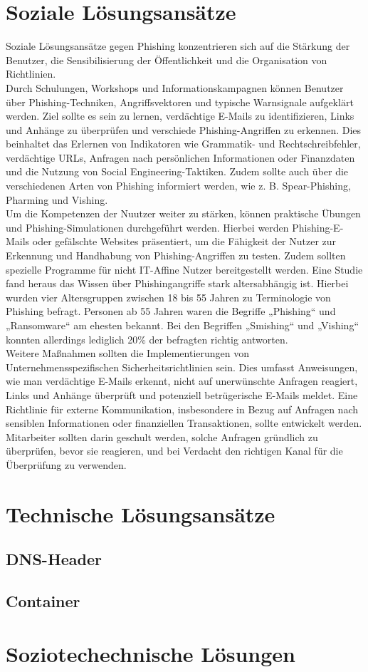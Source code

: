 \documentclass[journal=tosc,final]{iacrtrans}
\begin{document}
\section{Soziale Lösungsansätze}
Soziale Lösungsansätze gegen Phishing konzentrieren sich auf die Stärkung der Benutzer, die Sensibilisierung der Öffentlichkeit und die Organisation von Richtlinien.\\
Durch Schulungen, Workshops und Informationskampagnen können Benutzer über Phishing-Techniken, Angriffsvektoren und typische Warnsignale aufgeklärt werden. Ziel sollte es sein zu lernen, verdächtige E-Mails zu identifizieren, Links und Anhänge zu überprüfen und verschiede Phishing-Angriffen zu erkennen. Dies beinhaltet das Erlernen von Indikatoren wie Grammatik- und Rechtschreibfehler, verdächtige URLs, Anfragen nach persönlichen Informationen oder Finanzdaten und die Nutzung von Social Engineering-Taktiken. Zudem sollte auch über die verschiedenen Arten von Phishing informiert werden, wie z. B. Spear-Phishing, Pharming und Vishing.\\ Um die Kompetenzen der Nuutzer weiter zu stärken, können praktische Übungen und Phishing-Simulationen durchgeführt werden. Hierbei werden  Phishing-E-Mails oder gefälschte Websites präsentiert, um die Fähigkeit der Nutzer zur Erkennung und Handhabung von Phishing-Angriffen zu testen. Zudem sollten spezielle Programme für nicht IT-Affine Nutzer bereitgestellt werden. Eine Studie fand heraus das Wissen über Phishingangriffe stark altersabhängig ist. Hierbei wurden vier Altersgruppen zwischen 18 bis 55 Jahren zu Terminologie von Phishing befragt. Personen ab 55 Jahren waren die Begriffe „Phishing“ und „Ransomware“ am ehesten bekannt. Bei den Begriffen „Smishing“ und „Vishing“ konnten allerdings lediglich 20\% der befragten richtig antworten.\\
Weitere Maßnahmen sollten die Implementierungen von Unternehmensspezifischen Sicherheitsrichtlinien sein. Dies umfasst Anweisungen, wie man verdächtige E-Mails erkennt, nicht auf unerwünschte Anfragen reagiert, Links und Anhänge überprüft und potenziell betrügerische E-Mails meldet. Eine Richtlinie für externe Kommunikation, insbesondere in Bezug auf Anfragen nach sensiblen Informationen oder finanziellen Transaktionen, sollte entwickelt werden. Mitarbeiter sollten darin geschult werden, solche Anfragen gründlich zu überprüfen, bevor sie reagieren, und bei Verdacht den richtigen Kanal für die Überprüfung zu verwenden.

\newpage
\section{Technische Lösungsansätze}
\subsection{DNS-Header}
\subsection{Container}
\section{Soziotechechnische Lösungen}


\end{document}
